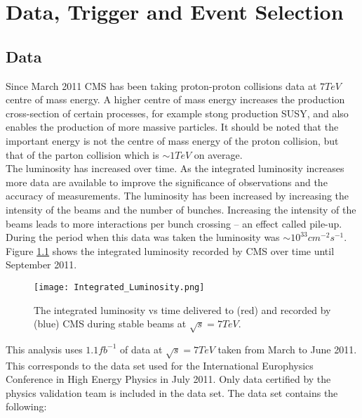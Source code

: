 \chapter{Data, Trigger and Event Selection}

\section{Data}

Since March 2011 CMS has been taking proton-proton collisions data at $7
\unit{TeV}$ centre of mass energy. A higher centre of mass energy increases the 
production cross-section of certain processes, for example stong production 
SUSY, and also enables the production of more massive particles. It should be 
noted that the important energy is not the centre of mass energy of the proton 
collision, but that of the parton collision which is $\sim 1 \unit{TeV}$ on 
average. \\

The luminosity has increased over time. As the integrated luminosity 
increases more data are available to improve the significance of 
observations and the accuracy of measurements. The luminosity has been increased
by increasing the intensity of the beams and the number of bunches. Increasing 
the intensity of the beams leads to more interactions per bunch crossing -- an 
effect called pile-up. During the period when this data was taken the luminosity
was $\sim 10^{33} \unit{cm^{-2}s^{-1}}$. \\

Figure \ref{fig:intlumi} shows the integrated luminosity recorded by CMS over 
time until September 2011. \\

\begin{figure}
\begin{center}
\texttt{[image: Integrated\_Luminosity.png]}
\caption{The integrated luminosity vs time delivered to (red) and recorded by
(blue) CMS during stable beams at $\sqrt{s} = 7 \unit{TeV}$.}
\end{center}
\label{fig:intlumi}
\end{figure}

This analysis uses $1.1 \unit{fb^{-1}}$ of data at $\sqrt{s} = 7 \unit{TeV}$ taken from 
March to June 2011. This corresponds to the data set used for the International
Europhysics Conference in High Energy Physics in July 2011. Only data certified 
by the physics validation team is included in the data set. The data set
contains the following:

